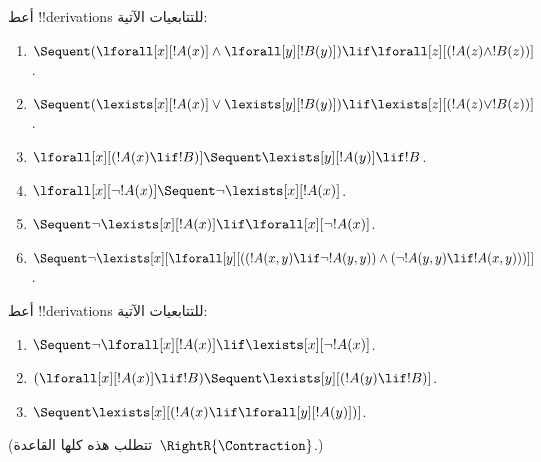 \documentclass[../../../include/open-logic-section]{subfiles}
\begin{document}
\begin{prob}
أعط !!{derivation}s للتتابعيات الآتية:
\begin{enumerate}
\item $\Sequent (\lforall[x][!A(x)] \land \lforall[y][!B(y)]) \lif
\lforall[z][(!A(z) \land !B(z))]$.
\item $\Sequent (\lexists[x][!A(x)] \lor \lexists[y][!B(y)]) \lif
\lexists[z][(!A(z) \lor !B(z))]$.
\item $\lforall[x][(!A(x) \lif !B)] \Sequent \lexists[y][!A(y)] \lif !B$.
\item $\lforall[x][\lnot !A(x)] \Sequent \lnot\lexists[x][!A(x)]$.
\item $\Sequent \lnot\lexists[x][!A(x)] \lif \lforall[x][\lnot !A(x)]$.
\item $\Sequent \lnot\lexists[x][\lforall[y][((!A(x,y) \lif \lnot
!A(y,y)) \land (\lnot !A(y,y) \lif !A(x,y)))]]$.
\end{enumerate}
\end{prob}

\begin{prob}
أعط !!{derivation}s للتتابعيات الآتية:
\begin{enumerate}
\item $\Sequent \lnot\lforall[x][!A(x)] \lif \lexists[x][\lnot!A(x)]$.
\item $(\lforall[x][!A(x)] \lif !B) \Sequent \lexists[y][(!A(y) \lif !B)]$.
\item $\Sequent \lexists[x][(!A(x) \lif \lforall[y][!A(y)])]$.
\end{enumerate}
(تتطلب هذه كلها القاعدة~$\RightR{\Contraction}$.)
\end{prob}
\end{document}
